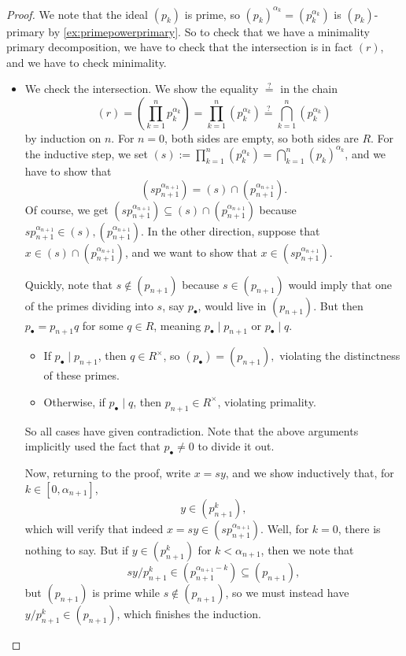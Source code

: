 \documentclass[../notes.tex]{subfiles}
\begin{document}
\begin{proof}
	We note that the ideal $(p_k)$ is prime, so $(p_k)^{\alpha_k}=(p_k^{\alpha_k})$ is $(p_k)$-primary by \autoref{ex:primepowerprimary}. So to check that we have a minimality primary decomposition, we have to check that the intersection is in fact $(r)$, and we have to check minimality. \begin{itemize}
		\item We check the intersection. We show the equality $\stackrel?=$ in the chain
		\[(r)=\left(\prod_{k=1}^np_k^{\alpha_k}\right)=\prod_{k=1}^n\left(p_k^{\alpha_k}\right)\stackrel?=\bigcap_{k=1}^n\left(p_k^{\alpha_k}\right)\]
		by induction on $n$. For $n=0$, both sides are empty, so both sides are $R$. For the inductive step, we set $(s):=\prod_{k=1}^n\left(p_k^{\alpha_k}\right)=\bigcap_{k=1}^n\left(p_k\right)^{\alpha_k}$, and we have to show that
		\[\left(sp_{n+1}^{\alpha_{n+1}}\right)=(s)\cap\left(p_{n+1}^{\alpha_{n+1}}\right).\]
		Of course, we get $\left(sp_{n+1}^{\alpha_{n+1}}\right)\subseteq(s)\cap\left(p_{n+1}^{\alpha_{n+1}}\right)$ because $sp_{n+1}^{\alpha_{n+1}}\in(s),\left(p_{n+1}^{\alpha_{n+1}}\right)$. In the other direction, suppose that $x\in(s)\cap\left(p_{n+1}^{\alpha_{n+1}}\right)$, and we want to show that $x\in\left(sp_{n+1}^{\alpha_{n+1}}\right)$.
		
		Quickly, note that $s\notin(p_{n+1})$ because $s\in(p_{n+1})$ would imply that one of the primes dividing into $s$, say $p_\bullet$, would live in $(p_{n+1})$. But then $p_\bullet=p_{n+1}q$ for some $q\in R$, meaning $p_\bullet\mid p_{n+1}$ or $p_\bullet\mid q$.
		\begin{itemize}
			\item If $p_\bullet\mid p_{n+1}$, then $q\in R^\times$, so $(p_\bullet)=(p_{n+1}),$ violating the distinctness of these primes.
			\item Otherwise, if $p_\bullet\mid q$, then $p_{n+1}\in R^\times$, violating primality.
		\end{itemize}
		So all cases have given contradiction. Note that the above arguments implicitly used the fact that $p_\bullet\ne0$ to divide it out.
		
		Now, returning to the proof, write $x=sy$, and we show inductively that, for $k\in[0,\alpha_{n+1}]$,
		\[y\in\left(p_{n+1}^k\right),\]
		which will verify that indeed $x=sy\in\left(sp_{n+1}^{\alpha_{n+1}}\right)$. Well, for $k=0$, there is nothing to say. But if $y\in\left(p_{n+1}^k\right)$ for $k<\alpha_{n+1}$, then we note that
		\[sy/p_{n+1}^k\in\left(p_{n+1}^{\alpha_{n+1}-k}\right)\subseteq(p_{n+1}),\]
		but $(p_{n+1})$ is prime while $s\notin(p_{n+1})$, so we must instead have $y/p_{n+1}^k\in(p_{n+1})$, which finishes the induction.


\end{itemize}
\end{proof}
\end{document}
